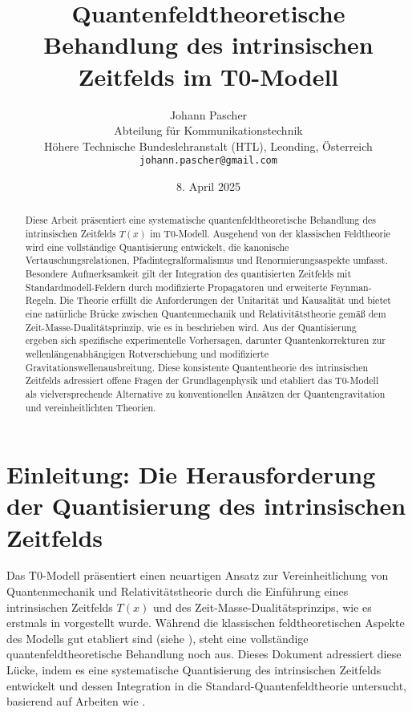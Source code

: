 \documentclass[12pt,a4paper]{article}
\title{Quantenfeldtheoretische Behandlung des intrinsischen Zeitfelds im T0-Modell}
\author{Johann Pascher\\
	Abteilung für Kommunikationstechnik\\
	Höhere Technische Bundeslehranstalt (HTL), Leonding, Österreich\\
	\texttt{johann.pascher@gmail.com}}
\date{8. April 2025}
\newcommand{\Tfield}{T(x)}
\begin{document}
	
	\maketitle
	
	\begin{abstract}
		Diese Arbeit präsentiert eine systematische quantenfeldtheoretische Behandlung des intrinsischen Zeitfelds $\Tfield$ im T0-Modell. Ausgehend von der klassischen Feldtheorie wird eine vollständige Quantisierung entwickelt, die kanonische Vertauschungsrelationen, Pfadintegralformalismus und Renormierungsaspekte umfasst. Besondere Aufmerksamkeit gilt der Integration des quantisierten Zeitfelds mit Standardmodell-Feldern durch modifizierte Propagatoren und erweiterte Feynman-Regeln. Die Theorie erfüllt die Anforderungen der Unitarität und Kausalität und bietet eine natürliche Brücke zwischen Quantenmechanik und Relativitätstheorie gemäß dem Zeit-Masse-Dualitätsprinzip, wie es in \cite{pascher_dualismus_2025} beschrieben wird. Aus der Quantisierung ergeben sich spezifische experimentelle Vorhersagen, darunter Quantenkorrekturen zur wellenlängenabhängigen Rotverschiebung und modifizierte Gravitationswellenausbreitung. Diese konsistente Quantentheorie des intrinsischen Zeitfelds adressiert offene Fragen der Grundlagenphysik und etabliert das T0-Modell als vielversprechende Alternative zu konventionellen Ansätzen der Quantengravitation und vereinheitlichten Theorien.
	\end{abstract}
	
	\tableofcontents
	\newpage
	
	\section{Einleitung: Die Herausforderung der Quantisierung des intrinsischen Zeitfelds}
	\label{sec:einleitung}
	
	Das T0-Modell präsentiert einen neuartigen Ansatz zur Vereinheitlichung von Quantenmechanik und Relativitätstheorie durch die Einführung eines intrinsischen Zeitfelds $\Tfield$ und des Zeit-Masse-Dualitätsprinzips, wie es erstmals in \cite{pascher_zeit_masse_2025} vorgestellt wurde. Während die klassischen feldtheoretischen Aspekte des Modells gut etabliert sind (siehe \cite{pascher_lagrange_2025}), steht eine vollständige quantenfeldtheoretische Behandlung noch aus. Dieses Dokument adressiert diese Lücke, indem es eine systematische Quantisierung des intrinsischen Zeitfelds entwickelt und dessen Integration in die Standard-Quantenfeldtheorie untersucht, basierend auf Arbeiten wie \cite{pascher_erweiterung_2025}.
	
\end{document}
